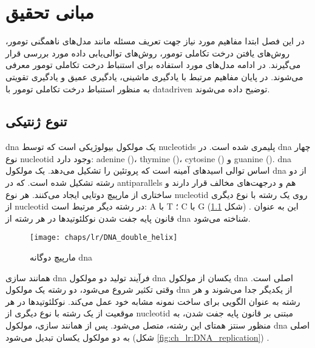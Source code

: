 
\chapter{مبانی تحقیق}

در این فصل ابتدا مفاهیم مورد نیاز جهت تعریف مسئله مانند مدل‌های ناهمگنی تومور، روش‌های یافتن درخت تکاملی تومور، روش‌های توالی‌یابی داده مورد بررسی قرار می‌گیرند. در ادامه مدل‌های مورد استفاده برای استنباط درخت تکاملی تومور معرفی می‌شوند. در پایان مفاهیم مرتبط با یادگیری ماشینی، یادگیری عمیق و یادگیری تقویتی به منظور استنباط درخت تکاملی تومور با \gls{datadriven}  توضیح داده می‌شوند.


\section{تنوع ژنتیکی}

\gls{dna} 
یک مولکول بیولوژیکی است که توسط \glspl{nucleotid}  پلیمری شده است. در \gls{dna} چهار نوع \gls{nucleotid} وجود دارد: \gls{adenine}  ()، \gls{thymine}  ()، \gls{cytosine} () و
 \gls{guanine} ().
  \gls{dna} اساس توالی اسیدهای آمینه است که پروتئین را تشکیل می‌دهد. یک مولکول \gls{dna} از دو رشته تشکیل شده است. که در \glspl{antiparallel}  هم و درجهت‌های مخالف قرار دارند و ساختاری از مارپیچ دوتایی ایجاد می‌کنند. هر نوع \gls{nucleotid} روی یک رشته با نوع دیگری از \gls{nucleotid} در رشته دیگر مرتبط است: A با T ؛ C با G (شکل \ref{fig:ch_lr:DNA_double_helix}) \cite{alberts2002molecular}. این به عنوان قانون پایه جفت شدن نوکلئوتید‌ها در هر رشته از \gls{dna} شناخته می‌شود.


\begin{figure}[!ht]
	\centerline{\texttt{[image: chaps/lr/DNA\_double\_helix]}}
	\caption{مارپیچ دوگانه \gls{dna}}
	\label{fig:ch_lr:DNA_double_helix}
\end{figure}



همانند سازی \gls{dna} فرآیند تولید دو مولکول \gls{dna} یکسان از مولکول \gls{dna} اصلی است. وقتی تکثیر شروع می‌شود، دو رشته یک مولکول \gls{dna} از یکدیگر جدا می‌شوند و هر رشته به عنوان الگویی برای ساخت نمونه مشابه خود عمل می‌کند. نوکلئوتید‌ها در هر موقعیت از یک رشته با نوع دیگری از \gls{nucleotid} مبتنی بر قانون پایه جفت شدن، به منظور سنتز همتای این رشته، متصل می‌شود. پس از همانند سازی، مولکول \gls{dna} اصلی به دو مولکول یکسان تبدیل می‌شود (شکل \ref{fig:ch_lr:DNA_replication}) \cite{alberts2002molecular}.

